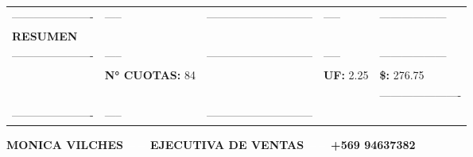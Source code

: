 \documentclass[10pt]{article}
\begin{document}
\begin{tabular}{lllll}
\hline
\color{white}----------------------& \color{white}----- & \color{white}----------------------------- & \color{white}-----  & \color{white}------------------ \\
\textbf{\Large RESUMEN} & & & &\\ 
\color{white}----------------------& \color{white}----- & \color{white}----------------------------- & \color{white}-----  & \color{white}------------------ \\
 & \textbf{N° CUOTAS: }84& &\textbf{UF: } 2.25 & \textbf{\$: } 276.75 \\  
 & & & &\color{white}---------------------- \\
 \color{white}----------------------& \color{white}----- & \color{white}----------------------------- &\\

 \hline
 \end{tabular}
 \begin{center}
     \textbf{MONICA VILCHES  $\color{white}--$  EJECUTIVA DE VENTAS $\color{white}--$   +569 94637382}
 \end{center}
 
\end{document}
